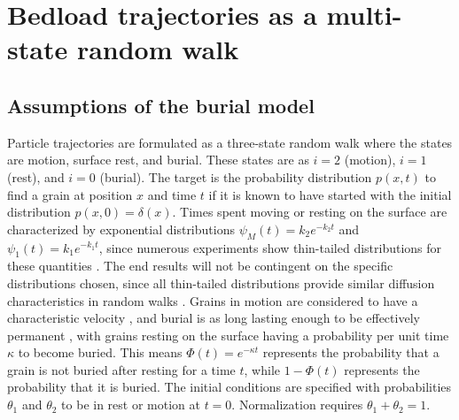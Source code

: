 \section{Bedload trajectories as a multi-state random walk}
\label{sec:model}
\subsection{Assumptions of the burial model}
\label{sec:assumptions}
Particle trajectories are formulated as a three-state random walk where the states are motion, surface rest, and burial. These states are \DIFdelbegin {}\DIFdelend \DIFaddbegin {}\DIFaddend as $i=2$ (motion), $i=1$ (rest), and $i=0$ (burial).
The target is the probability distribution $p(x,t)$ to find a grain at position $x$ and time $t$ if it is known to have started with the initial distribution $p(x,0)=\delta(x)$.
Times spent moving or resting on the surface are characterized by exponential distributions $\psi_M(t)=k_2e^{-k_2 t}$ and $\psi_1(t) = k_1e^{-k_1t}$, since numerous experiments show thin-tailed distributions for these quantities \citep{Fathel2015,Roseberry2012,Einstein1937,Ancey2006,Martin2012}. The end results will not be contingent on the specific distributions chosen, since all thin-tailed distributions provide similar diffusion characteristics in random walks \citep{Weiss1994,Weeks1998}.
Grains in motion are considered to have a characteristic velocity \DIFdelbegin {}\DIFdelend \DIFaddbegin {}\DIFaddend \citep{Lisle1998,Lajeunesse2017}, and burial is \DIFdelbegin {}\DIFdelend \DIFaddbegin {}\DIFaddend as long lasting enough to be effectively permanent \citep{Wu2019}, with grains resting on the surface having a probability per unit time $\kappa$ to become buried.
This means $\Phi(t) = e^{-\kappa t}$ represents the probability that a grain is not buried after resting for a time $t$, while $1-\Phi(t)$ represents the probability that it is buried.
The initial conditions are specified with probabilities $\theta_1$ and $\theta_2$ to be in rest or motion at $t=0$. Normalization requires $\theta_1+\theta_2=1$.

